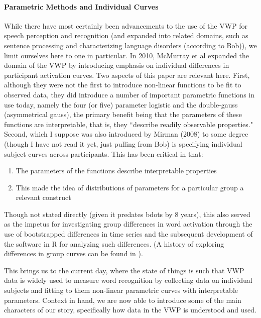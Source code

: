 \paragraph{Parametric Methods and Individual Curves} While there have most certainly been advancements to the use of the VWP for speech perception and recognition (and expanded into related domains, such as sentence processing and characterizing language disorders (according to Bob)), we  limit ourselves here to one in particular. In 2010, McMurray et al expanded the domain of the VWP by introducing emphasis on individual differences in participant activation curves. Two aspects of this paper are relevant here. First, although they were not the first to introduce non-linear functions to be fit to observed data, they did introduce a number of important parametric functions in use today, namely the four (or five) parameter logistic and the double-gauss (asymmetrical gauss), the primary benefit being that the parameters of these functions are interpretable, that is, they ``describe readily observable properties." Second, which I suppose was also introduced by Mirman (2008) \cite{Mirman2008} to some degree (though I have not read it yet, just pulling from Bob) is specifying individual subject curves across participants. This has been critical in that:

\begin{singlespace}
\begin{enumerate}
\vspace{-3mm}
\item The parameters of the functions describe interpretable properties
\item This made the idea of distributions of parameters for a particular group a relevant construct
\end{enumerate}
\end{singlespace}

Though not stated directly (given it predates bdots by 8 years), this also served as the impetus for investigating group differences in word activation through the use of bootstrapped differences in time series \cite{oleson2017detecting} and the subsequent development of the  software in R for analyzing such differences. (A history of exploring differences in group curves can be found in \cite{seedorff2018bdots}).

This brings us to the current day, where the state of things is such that VWP data is widely used to measure word recognition by collecting data on individual subjects and fitting to them non-linear parametric curves with interpretable parameters. Context in hand, we are now able to introduce some of the main characters of our story, specifically how data in the VWP is understood and used. 



